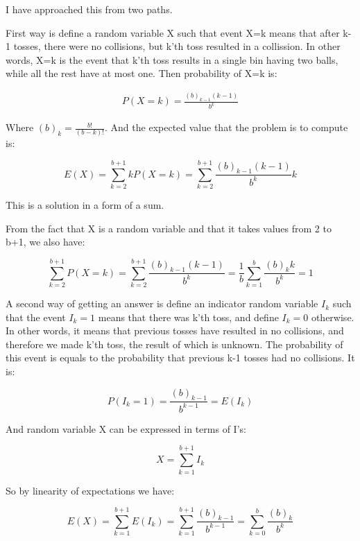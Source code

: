 \documentclass{book}
\begin{document}
\begin{CJK}{UTF8}{gkai}
I have approached this from two paths.

First way is define a random variable X such that event X=k means that after k-1 
tosses, there were no collisions, but k'th toss resulted in a collission. In 
other words, X=k is the event that k'th toss results in a single bin having two 
balls, while all the rest have at most one. Then probability of X=k is:

\begin{align*}
P(X=k) = \frac{(b)_{k-1}(k-1)}{b^k}
\end{align*}

Where $(b)_{k}=\frac{b!}{(b-k)!}$. And the expected value that the problem is to 
compute is:

\begin{equation*}
E(X) = \sum_{k=2}^{b+1} kP(X=k) = \sum_{k=2}^{b+1} \frac{(b)_{k-1}(k-1)}{b^k}k
\end{equation*}

This is a solution in a form of a sum.

From the fact that X is a random variable and that it takes values from 2 to b+1, we also have:

\begin{equation*}
\sum_{k=2}^{b+1}P(X=k) = \sum_{k=2}^{b+1}\frac{(b)_{k-1}(k-1)}{b^k} = \frac{1}{b}\sum_{k=1}^{b}\frac{(b)_{k}k}{b^k}=1
\end{equation*}

A second way of getting an answer is define an indicator random variable $I_{k}$ 
such that the event $I_{k}=1$ means that there was k'th toss, and define 
$I_{k}=0$ otherwise. In other words, it means that previous tosses have resulted 
in no collisions, and therefore we made k'th toss, the result of which is 
unknown. The probability of this event is equals to the probability that 
previous k-1 tosses had no collisions. It is:

\begin{equation*}
P(I_{k}=1) = \frac{(b)_{k-1}}{b^{k-1}} = E(I_{k})
\end{equation*}

And random variable X can be expressed in terms of I's:

\begin{equation*}
X=\sum_{k=1}^{b+1}I_k
\end{equation*}

So by linearity of expectations we have:

\begin{equation*}
E(X)=\sum_{k=1}^{b+1}E(I_k) = \sum_{k=1}^{b+1}\frac{(b)_{k-1}}{b^{k-1}} = 
\sum_{k=0}^{b}\frac{(b)_k}{b^k}
\end{equation*}


\end{CJK}
\end{document}
